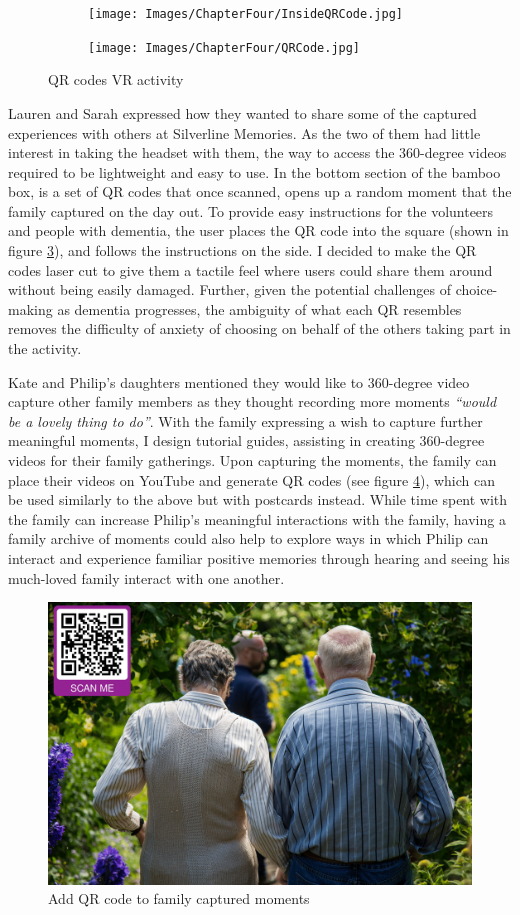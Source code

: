 \begin{figure}[htp]
\centering
\begin{subfigure}{.5\textwidth}
  \centering
  \texttt{[image: Images/ChapterFour/InsideQRCode.jpg]}
  \label{fig:insideQRBox}
\end{subfigure}%
\begin{subfigure}{.5\textwidth}
  \centering
  \texttt{[image: Images/ChapterFour/QRCode.jpg]}
  \label{fig:QRCode}
\end{subfigure}
\caption{QR codes VR activity}
\label{fig:QRcodes}
\end{figure}
Lauren and Sarah expressed how they wanted to share some of the captured experiences with others at Silverline Memories. As the two of them had little interest in taking the headset with them, the way to access the 360-degree videos required to be lightweight and easy to use. In the bottom section of the bamboo box, is a set of QR codes that once scanned, opens up a random moment that the family captured on the day out. To provide easy instructions for the volunteers and people with dementia, the user places the QR code into the square (shown in figure \ref{fig:QRcodes}), and follows the instructions on the side. I decided to make the QR codes laser cut to give them a tactile feel where users could share them around without being easily damaged. Further, given the potential challenges of choice-making as dementia progresses, the ambiguity of what each QR resembles removes the difficulty of anxiety of choosing on behalf of the others taking part in the activity.

Kate and Philip's daughters mentioned they would like to 360-degree video capture other family members as they thought recording more moments \textit{``would be a lovely thing to do''}. With the family expressing a wish to capture further meaningful moments, I design tutorial guides, assisting in creating 360-degree videos for their family gatherings. Upon capturing the moments, the family can place their videos on YouTube and generate QR codes (see figure \ref{fig:QRCode-Captured}), which can be used similarly to the above but with postcards instead. While time spent with the family can increase Philip’s meaningful interactions with the family, having a family archive of moments could also help to explore ways in which Philip can interact and experience familiar positive memories through hearing and seeing his much-loved family interact with one another.

\begin{figure}[htp]
\centering
\includegraphics[width=.6\linewidth]{Images/ChapterFour/QRScanPhoto.png}
\caption{Add QR code to family captured moments}
\label{fig:QRCode-Captured}
\end{figure}

